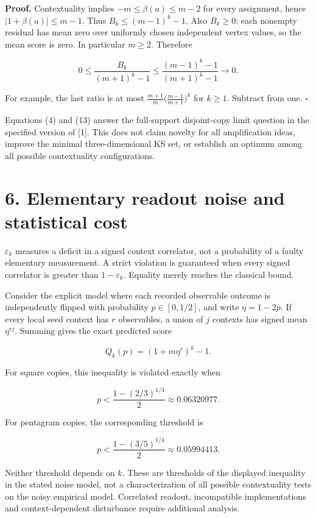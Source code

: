 \documentclass[10pt,a4paper]{article}
\begin{document}
\textbf{Proof.} Contextuality implies \(-m\le\beta(a)\le m-2\) for every assignment, hence \(|1+\beta(a)|\le m-1\). Thus \(B_k\le(m-1)^k-1\). Also \(B_k\ge0\): each nonempty residual has mean zero over uniformly chosen independent vertex values, so the mean score is zero. In particular \(m\ge2\). Therefore

\[0\le\frac{B_k}{(m+1)^k-1}
\le\frac{(m-1)^k-1}{(m+1)^k-1}\longrightarrow0. \tag{13}\]

For example, the last ratio is at most \(\frac{m+1}{m}\bigl(\frac{m-1}{m+1}\bigr)^k\) for \(k\ge1\). Subtract from one. \(\square\)

Equations (4) and (13) answer the full-support disjoint-copy limit question in the specified version of {[}1{]}. This does not claim novelty for all amplification ideas, improve the minimal three-dimensional KS set, or establish an optimum among all possible contextuality configurations.

\section{6. Elementary readout noise and statistical cost}\label{elementary-readout-noise-and-statistical-cost}

\(\varepsilon_k\) measures a deficit in a signed context correlator, not a probability of a faulty elementary measurement. A strict violation is guaranteed when every signed correlator is greater than \(1-\varepsilon_k\). Equality merely reaches the classical bound.

Consider the explicit model where each recorded observable outcome is independently flipped with probability \(p\in[0,1/2]\), and write \(\eta=1-2p\). If every local seed context has \(r\) observables, a union of \(j\) contexts has signed mean \(\eta^{rj}\). Summing gives the exact predicted score

\[Q_k(p)=(1+m\eta^r)^k-1. \tag{14}\]

For square copies, this inequality is violated exactly when

\[p<\frac{1-(2/3)^{1/3}}2\approx0.06320977. \tag{15}\]

For pentagram copies, the corresponding threshold is

\[p<\frac{1-(3/5)^{1/4}}2\approx0.05994413. \tag{16}\]

Neither threshold depends on \(k\). These are thresholds of the displayed inequality in the stated noise model, not a characterization of all possible contextuality tests on the noisy empirical model. Correlated readout, incompatible implementations and context-dependent disturbance require additional analysis.
\end{document}
